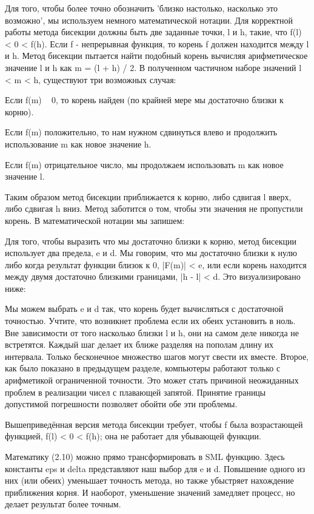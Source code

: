 Для того, чтобы более точно обозначить 'близко настолько, насколько это возможно', мы используем немного математической нотации. Для корректной работы метода бисекции должны быть две заданные точки, l и h, такие, что f(l) < 0 < f(h). Если f - непрерывная функция, то корень f должен находится между l и h. Метод бисекции пытается найти подобный корень вычисляя арифметическое значение l и h как m = (l + h) / 2. В полученном частичном наборе значений l < m < h, существуют три возможных случая:

Если f(m) ~ 0, то корень найден (по крайней мере мы достаточно близки к корню).

Если f(m) положительно, то нам нужном сдвинуться влево и продолжить использование m как новое значение h.

Если f(m) отрицательное число, мы продолжаем использовать m как новое значение l.

Таким образом метод бисекции приближается к корню, либо сдвигая l вверх, либо сдвигая h вниз. Метод заботится о том, чтобы эти значения не пропустили корень. В математической нотации мы запишем:

Для того, чтобы выразить что мы достаточно близки к корню, метод бисекции использует два предела, e и d. Мы говорим, что мы достаточно близки к нулю либо когда результат функции близок к 0, |F(m)| < e, или если корень находится между двумя достаточно близкими границами, |h - l| < d. Это визуализировано ниже:

Мы можем выбрать e и d так, что корень будет вычисляться с достаточной точностью. Учтите, что возникнет проблема если их обеих установить в ноль. Вне зависимости от того насколько близки l и h, они на самом деле никогда не встретятся. Каждый шаг делает их ближе разделяя на пополам длину их интервала. Только бесконечное множество шагов могут свести их вместе. Второе, как было показано в предыдущем разделе, компьютеры работают только с арифметикой ограниченной точности. Это может стать причиной неожиданных проблем в реализации чисел с плавающей запятой. Принятие границы допустимой погрешности позволяет обойти обе эти проблемы.

Вышеприведённая версия метода бисекции требует, чтобы f была возрастающей функцией, f(l) < 0 < f(h); она не работает для убывающей функции.

Математику (2.10) можно прямо трансформировать в SML функцию. Здесь константы eps и delta представляют наш выбор для e и d. Повышение одного из них (или обеих) уменьшает точность метода, но также убыстряет нахождение приближения корня. И наоборот, уменьшение значений замедляет процесс, но делает результат более точным.

